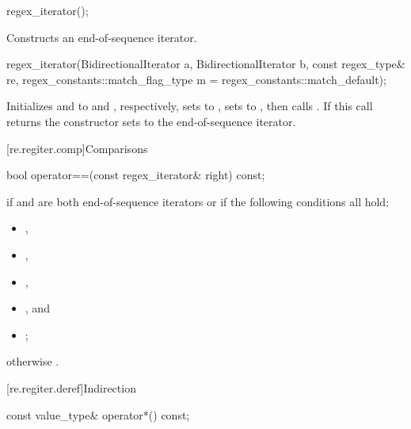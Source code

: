 %
\begin{itemdecl}
regex_iterator();
\end{itemdecl}

\begin{itemdescr}
\pnum
\effects
Constructs an end-of-sequence iterator.
\end{itemdescr}

%
\begin{itemdecl}
regex_iterator(BidirectionalIterator a, BidirectionalIterator b,
               const regex_type& re,
               regex_constants::match_flag_type m = regex_constants::match_default);
\end{itemdecl}

\begin{itemdescr}
\pnum
\effects
Initializes  and  to
 and , respectively, sets
 to , sets  to
, then calls . If this
call returns  the constructor sets  to the end-of-sequence
iterator.
\end{itemdescr}

[re.regiter.comp]{Comparisons}

%
\begin{itemdecl}
bool operator==(const regex_iterator& right) const;
\end{itemdecl}

\begin{itemdescr}
\pnum
\returns
{} if  and  are both end-of-sequence
iterators or if the following conditions all hold:
\begin{itemize}
\item {},
\item {},
\item {},
\item {}, and
\item {};
\end{itemize}
otherwise .
\end{itemdescr}

[re.regiter.deref]{Indirection}

%
\begin{itemdecl}
const value_type& operator*() const;
\end{itemdecl}

